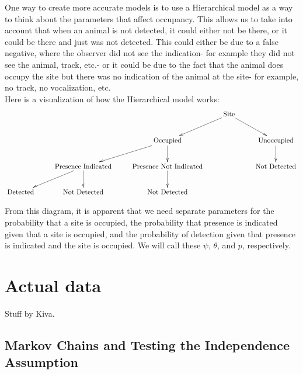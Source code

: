 \documentclass{article}
\begin{document}
	One way to create more accurate models is to use a Hierarchical model as a 
way to think about the parameters that affect occupancy.  This allows us to take
into account that when an animal is not detected, it could either not be there, 
or it could be there and just was not detected.  This could either be due to
a false negative, where the observer did not see the indication- for example they 
did not see the animal, track, etc.- or it could be due to the fact that the 
animal does occupy the site but there was no indication of the animal at the 
site- for example, no track, no vocalization, etc.  \\
Here is a visualization of how the Hierarchical model works:
	\begin{displaymath}
		\xymatrix{          	   &                                  		 &                               		&\text{Site} \ar[dl] \ar[dr] & \\
				            	   &                                  		 & \text{Occupied} \ar[dl] \ar[d]		&                            & \text{Unoccupied} \ar[d] \\
				            	   & \text{Presence Indicated} \ar[dl] \ar[d]& \text{Presence Not Indicated} \ar[d]&                            & \text{Not Detected} \\
				   \text{Detected} & \text{Not Detected}              		 & \text{Not Detected}                  &                            &   }
	\end{displaymath}

From this diagram, it is apparent that we need separate parameters for the 
probability that a site is occupied, the probability that presence is indicated
given that a site is occupied, and the probability of detection given that 
presence is indicated and the site is occupied.  We will call these \(\psi\),
\(\theta\), and \(p\), respectively.

\section{Actual data}
Stuff by Kiva.

	\subsection{Markov Chains and Testing the Independence Assumption}
\end{document}
